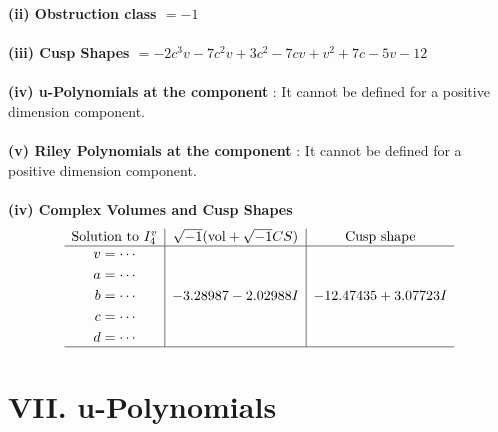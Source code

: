 \documentclass[1p]{elsarticle_modified}
\theoremstyle{definition}
\newcommand{\I}{\sqrt{-1}}
\begin{document}
\flushleft \textbf{(ii) Obstruction class $= -1$}\\~\\
\flushleft \textbf{(iii) Cusp Shapes $= -2 c^3 v-7 c^2 v+3 c^2-7 c v+v^2+7 c-5 v-12$}\\~\\
\flushleft \textbf{(iv) u-Polynomials at the component} : It cannot be defined for a positive dimension component.\\~\\
\flushleft \textbf{(v) Riley Polynomials at the component} : It cannot be defined for a positive dimension component.\\~\\
\newpage\flushleft \textbf{(iv) Complex Volumes and Cusp Shapes}
$$\begin{array}{c|c|c} 
\text{Solution to }I^v_{4}& \I (\text{vol} + \sqrt{-1}CS) & \text{Cusp shape}\\
 \hline 
\begin{aligned}
v &= \cdots \\
a &= \cdots \\
b &= \cdots \\
c &= \cdots \\
d &= \cdots\end{aligned}
 & -3.28987 - 2.02988 I & -12.47435 + 3.07723 I\\
 \hline 
 \end{array}
$$
\newpage\renewcommand{\arraystretch}{1}
\centering \section*{ VII. u-Polynomials}
\end{document}
